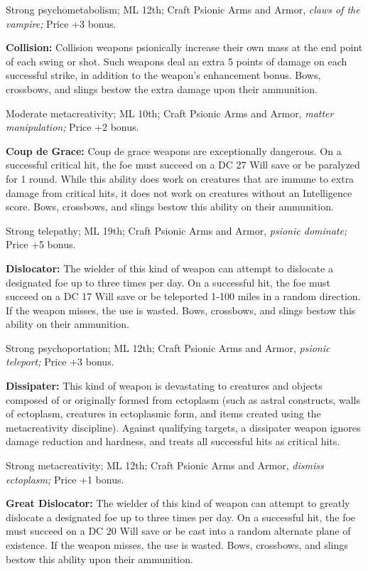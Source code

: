 \documentclass{article}
\begin{document}
Strong psychometabolism; ML 12th; Craft Psionic Arms and Armor, \textit{claws of 
the vampire; }Price +3 bonus.

\textbf{Collision: }Collision weapons psionically increase their own mass at the 
end point of each swing or shot. Such weapons deal an extra 5 points of damage 
on each successful strike, in addition to the weapon's enhancement bonus. Bows, 
crossbows, and slings bestow the extra damage upon their ammunition.

Moderate metacreativity; ML 10th; Craft Psionic Arms and Armor, \textit{matter 
manipulation; }Price +2 bonus.

\textbf{Coup de Grace: }Coup de grace weapons are exceptionally dangerous. On a 
successful critical hit, the foe must succeed on a DC 27 Will save or be paralyzed 
for 1 round. While this ability does work on creatures that are immune to extra 
damage from critical hits, it does not work on creatures without an Intelligence 
score. Bows, crossbows, and slings bestow this ability on their ammunition.

Strong telepathy; ML 19th; Craft Psionic Arms and Armor, \textit{psionic dominate; 
}Price +5 bonus.

\textbf{Dislocator:} The wielder of this kind of weapon can attempt to dislocate 
a designated foe up to three times per day. On a successful hit, the foe must succeed 
on a DC 17 Will save or be teleported 1-100 miles in a random direction. If the 
weapon misses, the use is wasted. Bows, crossbows, and slings bestow this ability 
on their ammunition.

Strong psychoportation; ML 12th; Craft Psionic Arms and Armor, \textit{psionic 
teleport; }Price +3 bonus.

\textbf{Dissipater: }This kind of weapon is devastating to creatures and objects 
composed of or originally formed from ectoplasm (such as astral constructs, walls 
of ectoplasm, creatures in ectoplasmic form, and items created using the metacreativity 
discipline). Against qualifying targets, a dissipater weapon ignores damage reduction 
and hardness, and treats all successful hits as critical hits. 

Strong metacreativity; ML 12th; Craft Psionic Arms and Armor, \textit{dismiss ectoplasm; 
}Price +1 bonus.

\textbf{Great Dislocator:} The wielder of this kind of weapon can attempt to greatly 
dislocate a designated foe up to three times per day. On a successful hit, the 
foe must succeed on a DC 20 Will save or be cast into a random alternate plane 
of existence. If the weapon misses, the use is wasted. Bows, crossbows, and slings 
bestow this ability upon their ammunition.
\end{document}
